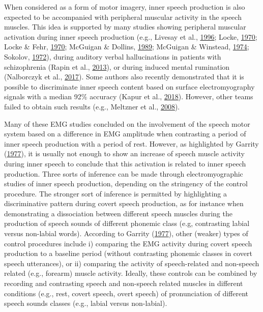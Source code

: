 \documentclass[a4paper,12pt,twoside,onecolumn,openright,final,oldfontcommands]{memoir}
\begin{document}
When considered as a form of motor imagery, inner speech production is also expected to be accompanied with peripheral muscular activity in the speech muscles. This idea is supported by many studies showing peripheral muscular activation during inner speech production (e.g., Livesay et al., \protect\hyperlink{ref-livesay_covert_1996}{1996}; Locke, \protect\hyperlink{ref-locke_subvocal_1970-1}{1970}; Locke \& Fehr, \protect\hyperlink{ref-locke_subvocal_1970}{1970}; McGuigan \& Dollins, \protect\hyperlink{ref-mcguigan_patterns_1989}{1989}; McGuigan \& Winstead, \protect\hyperlink{ref-mcguigan_discriminative_1974}{1974}; Sokolov, \protect\hyperlink{ref-sokolov_inner_1972}{1972}), during auditory verbal hallucinations in patients with schizophrenia (Rapin et al., \protect\hyperlink{ref-Rapin2013}{2013}), or during induced mental rumination (Nalborczyk et al., \protect\hyperlink{ref-nalborczyk_orofacial_2017}{2017}). Some authors also recently demonstrated that it is possible to discriminate inner speech content based on surface electromyography signals with a median 92\% accuracy (Kapur et al., \protect\hyperlink{ref-kapur_alterego_2018}{2018}). However, other teams failed to obtain such results (e.g., Meltzner et al., \protect\hyperlink{ref-meltzner_speech_2008}{2008}).

Many of these EMG studies concluded on the involvement of the speech motor system based on a difference in EMG amplitude when contrasting a period of inner speech production with a period of rest. However, as highlighted by Garrity (\protect\hyperlink{ref-garrity_electromyography_1977}{1977}), it is usually not enough to show an increase of speech muscle activity during inner speech to conclude that this activation is related to inner speech production. Three sorts of inference can be made through electromyographic studies of inner speech production, depending on the stringency of the control procedure. The stronger sort of inference is permitted by highlighting a discriminative pattern during covert speech production, as for instance when demonstrating a dissociation between different speech muscles during the production of speech sounds of different phonemic class (e.g, contrasting labial versus non-labial words). According to Garrity (\protect\hyperlink{ref-garrity_electromyography_1977}{1977}), other (weaker) types of control procedures include i) comparing the EMG activity during covert speech production to a baseline period (without contrasting phonemic classes in covert speech utterances), or ii) comparing the activity of speech-related and non-speech related (e.g., forearm) muscle activity. Ideally, these controls can be combined by recording and contrasting speech and non-speech related muscles in different conditions (e.g., rest, covert speech, overt speech) of pronunciation of different speech sounds classes (e.g., labial versus non-labial).
\end{document}
